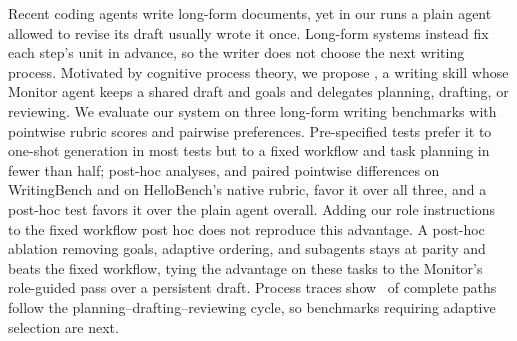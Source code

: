 Recent coding agents write long-form documents, yet in our runs a plain agent allowed to revise its draft usually wrote it once.
Long-form systems instead fix each step's unit in advance, so the writer does not choose the next writing process.
Motivated by cognitive process theory, we propose \condAgenticCogWriter, a writing skill whose Monitor agent keeps a shared draft and goals and delegates planning, drafting, or reviewing.
We evaluate our system on three long-form writing benchmarks with pointwise rubric scores and pairwise preferences.
Pre-specified tests prefer it to one-shot generation in most tests but to a fixed workflow and task planning in fewer than half; post-hoc analyses, and paired pointwise differences on WritingBench and on HelloBench's native rubric, favor it over all three, and a post-hoc test favors it over the plain agent overall.
Adding our role instructions to the fixed workflow post hoc does not reproduce this advantage.
A post-hoc ablation removing goals, adaptive ordering, and subagents stays at parity and beats the fixed workflow, tying the advantage on these tasks to the Monitor's role-guided pass over a persistent draft.
Process traces show \AfourCycleCompliantRate\ of complete paths follow the planning--drafting--reviewing cycle, so benchmarks requiring adaptive selection are next.
